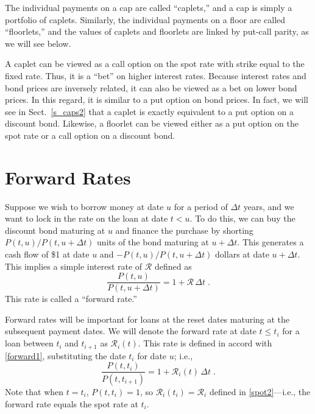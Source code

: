 The individual payments on a cap are called ``caplets,''  and a cap is simply a portfolio of caplets.    Similarly, the individual payments on a floor are called ``floorlets,''  and the values of caplets and floorlets are linked by put-call parity, as we will see below.  

A caplet can be viewed as a call option on the spot rate with strike equal to the fixed rate.  Thus, it is a ``bet'' on higher interest rates.  Because interest rates and bond prices are inversely related, it can also be viewed as a bet on lower bond prices.  In this regard, it is similar to a put option on bond prices.  In fact, we will see in  Sect.~\ref{s_caps2} that a caplet is exactly equivalent to a put option on a discount bond.  Likewise, a floorlet can be viewed either as a put option on the spot rate or a call option on a discount bond.

\section{Forward Rates}\label{s_forwardrates}

Suppose we wish to borrow money at date $u$ for a period of $\varDelta t$ years, and we want to lock in the rate on the loan at date $t<u$.  To do this, we can buy the discount bond maturing at $u$ and finance the purchase by shorting $P(t,u)/P(t,u+\varDelta t)$ units of the bond maturing at $u+\varDelta t$.  This generates a cash flow of \$1 at date $u$ and $-P(t,u)/P(t,u+\varDelta t)$ dollars at date $u+\varDelta t$.  This implies a simple interest rate of $\mathcal{R}$ defined as 
\begin{equation}\label{forward1}
\frac{P(t,u)}{P(t,u+\varDelta t)} = 1+\mathcal{R}\,\varDelta t\;.
\end{equation}
This rate is called a ``forward rate.'' 

Forward rates will be important for loans at the reset dates maturing at the subsequent payment dates.  We will denote the forward rate at date $t \leq t_i$ for a loan between $t_i$ and $t_{i+1}$ as $\mathcal{R}_i(t)$.  This rate is defined in accord with \eqref{forward1}, substituting the date $t_i$ for date $u$; i.e.,
\begin{equation}\label{forward2}
\frac{P(t,t_i)}{P(t,t_{i+1})}=1+\mathcal{R}_i(t)\,\varDelta t\;.
\end{equation}
Note that when $t=t_i$, $P(t,t_i)=1$, so $\mathcal{R}_i(t_i)=\mathcal{R}_i$ defined in \eqref{spot2}---i.e., the forward rate equals the spot rate at $t_i$.

